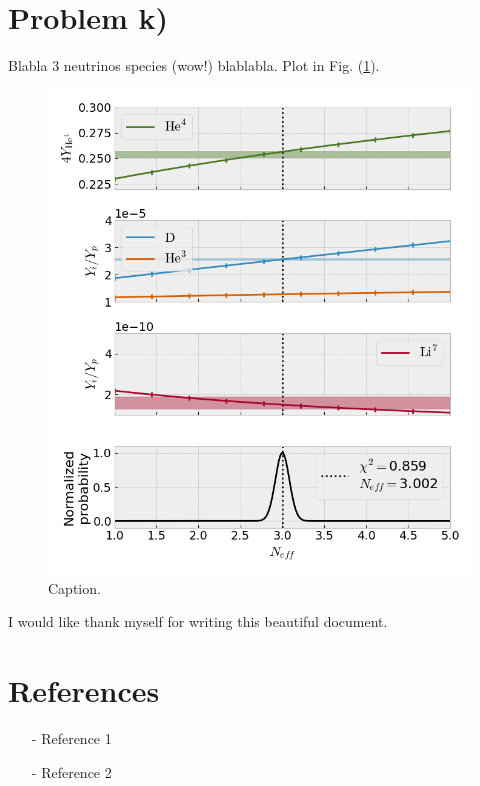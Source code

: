 \documentclass[reprint,english,notitlepage]{revtex4-1}  %
\numberwithin{equation}{section}
\begin{document}
\section{Problem k)}
Blabla 3 neutrinos species (wow!) blablabla. Plot in Fig. (\ref{fig:problem_k}).
\begin{figure}[h]
	\includegraphics[width=\columnwidth]{relic_abundances_k.png}
	\caption{Caption.}
	\label{fig:problem_k}
\end{figure}



\begin{acknowledgments}  %
I would like thank myself for writing this beautiful document.
\end{acknowledgments}


\section*{References}  %
\begin{itemize}
\item[-]Reference 1
\item[-]Reference 2
\end{itemize}
\end{document}
